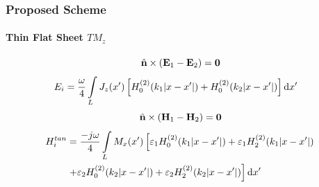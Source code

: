 \documentclass[mathserif,18pt,xcolor=table]{beamer}
\begin{document}
  \begin{frame}
    \frametitle{Proposed Scheme}
    \framesubtitle{Thin Flat Sheet $TM_z$}
        \begin{equation} \nonumber
          \hat{\mathbf{n}} \times (\mathbf{E}_1 - \mathbf{E}_2) = \mathbf{0}
          \label{eq:E1bc}
        \end{equation}
        \begin{align} \nonumber
          E_i ={}& \frac{\omega}{4} \int\limits_L J_z(x') \left[ H_0^{(2)}(k_1 | x -  x'|) + H_0^{(2)}(k_2 |x - x'|)\right] \mathop{}\!\mathrm{d}{x'}  \notag
          \label{eq:scalarE}
        \end{align}
        \begin{equation} \nonumber
          \hat{\mathbf{n}} \times (\mathbf{H}_1 - \mathbf{H}_2) = \mathbf{0}
          \label{eq:E1bc}
        \end{equation}
        \begin{align} \nonumber
          H_i^{tan} &= \frac{-j \omega}{4} \int\limits_L M_x(x') \left[ \varepsilon_1 H_0^{(2)}(k_1 |x - x'|) + \varepsilon_1 H_2^{(2)}(k_1 |x - x'|) \right. \notag\\
          & \left. + \varepsilon_2 H_0^{(2)}(k_2 |x - x'|) + \varepsilon_2 H_2^{(2)}(k_2 |x - x'|)\right] \mathop{}\!\mathrm{d}{x'} \notag
          \label{eq:scalarH}
        \end{align}
    \end{frame}
\end{document}
